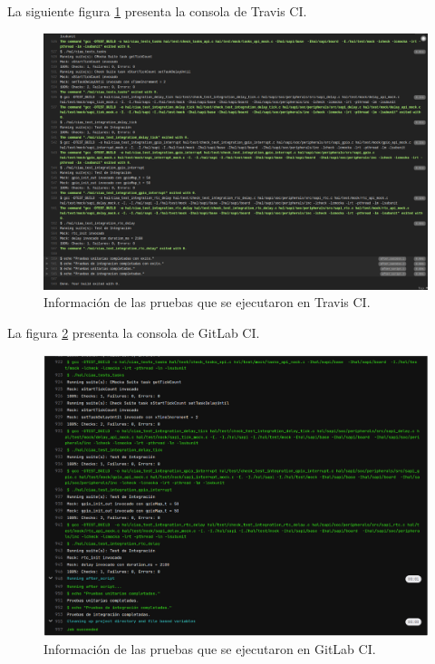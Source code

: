 La siguiente figura \ref{fig:travis} presenta la consola de Travis CI.  

\begin{figure}[ht]
	\centering
	\includegraphics[scale=.35]{./Figures/travis.png}
	\caption{Información de las pruebas que se ejecutaron en Travis CI.}
	\label{fig:travis}
\end{figure}

\hfill \break
\hfill \break
\hfill \break
\hfill \break
\hfill \break
\hfill \break

La figura \ref{fig:gitLab} presenta la consola de GitLab CI.  

\begin{figure}[ht]
	\centering
	\includegraphics[scale=.40]{./Figures/gitLab.png}
	\caption{Información de las pruebas que se ejecutaron en GitLab CI.}
	\label{fig:gitLab}
\end{figure}

